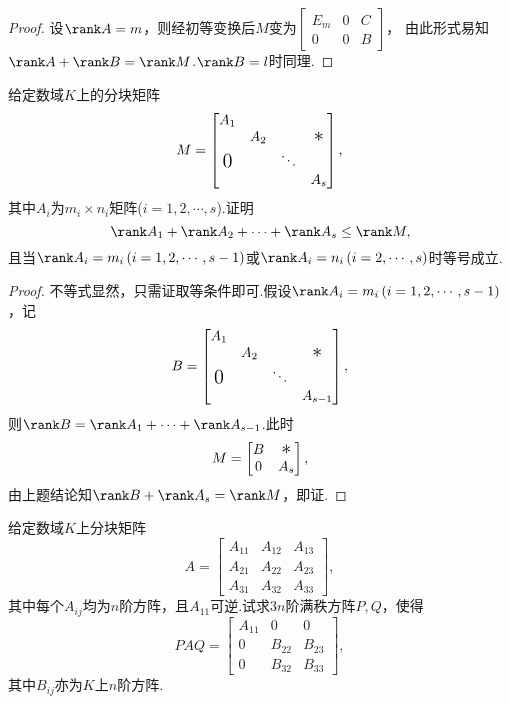\begin{proof}
	设$\rank A=m$，则经初等变换后$M$变为$\begin{bmatrix}
			E_m & 0 & C \\
			0   & 0 & B
		\end{bmatrix}$，
	由此形式易知$\rank A+\rank B=\rank M$.$\rank B=l$时同理.
\end{proof}
\begin{prob}[6]
	给定数域$K$上的分块矩阵
	\[
		M=\begin{bmatrix}
			A_1                &     &        &                    \\
			                   & A_2 &        & \mbox{\Large{$*$}} \\
			\mbox{\Large{$0$}} &     & \ddots &                    \\
			                   &     &        & A_s
		\end{bmatrix},
	\]
	其中$A_i$为$m_i\times n_i$矩阵($i=1,2,\cdots,s$).证明
	\[
		\rank A_1+\rank A_2+\cdots+\rank A_s\le\rank M,
	\]
	且当$\rank A_i=m_i\,(i=1,2,\cdots,s-1)$或$\rank A_i=n_i\,(i=2,\cdots,s)$时等号成立.
\end{prob}
\begin{proof}
	不等式显然，只需证取等条件即可.假设$\rank A_i=m_i\,(i=1,2,\cdots,s-1)$，记
	\[
		B=\begin{bmatrix}
			A_1                &     &        &                    \\
			                   & A_2 &        & \mbox{\Large{$*$}} \\
			\mbox{\Large{$0$}} &     & \ddots &                    \\
			                   &     &        & A_{s-1}
		\end{bmatrix},
	\]
	则$\rank B=\rank A_1+\cdots+\rank A_{s-1}$.此时
	\[
		M=\begin{bmatrix}
			B & \mbox{\Large{$*$}} \\
			0 & A_s
		\end{bmatrix},
	\]
	由上题结论知$\rank B+\rank A_s=\rank M$，即证.
\end{proof}
\begin{prob}[7]
	给定数域$K$上分块矩阵
	\[
		A=\begin{bmatrix}
			A_{11} & A_{12} & A_{13} \\
			A_{21} & A_{22} & A_{23} \\
			A_{31} & A_{32} & A_{33}
		\end{bmatrix},
	\]
	其中每个$A_{ij}$均为$n$阶方阵，且$A_{11}$可逆.试求$3n$阶满秩方阵$P,Q$，使得
	\[
		PAQ=\begin{bmatrix}
			A_{11} & 0      & 0      \\
			0      & B_{22} & B_{23} \\
			0      & B_{32} & B_{33}
		\end{bmatrix},
	\]
	其中$B_{ij}$亦为$K$上$n$阶方阵.
\end{prob}
